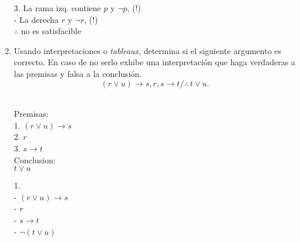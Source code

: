 \documentclass[a4paper,10pt]{article}
\begin{document}
\begin{enumerate}
3. La rama izq. contiene \(p\) y \(\neg p\), (!)\\
   - La derecha \(r\) y \(\neg r\), (!)\\

   $\therefore$ no es satisfacible

  
	\item {}
		Usando interpretaciones o \textit{tableaux}, determina si el siguiente argumento es correcto.   En caso de no serlo exhibe una interpretaci\'on que haga verdaderas a las premisas y falsa a la conclusi\'on.
		$$(r \lor u) \to s, r, s \to t  / \therefore  \  t \lor u.$$\\
\begin{multicols}{2}
Premisas:\\
1. $(r \lor u) \to s$\\
2. $r$\\
3. $s \to t$\\

Conclusion:\\
$t \lor u$\\
\end{multicols}

\begin{multicols}{2}
1. \\
   - $(r \lor u) \to s$\\
   - $r$\\
   - $s \to t$\\
   - $\neg (t \lor u)$\\
   

\end{multicols}
\end{enumerate}
\end{document}
